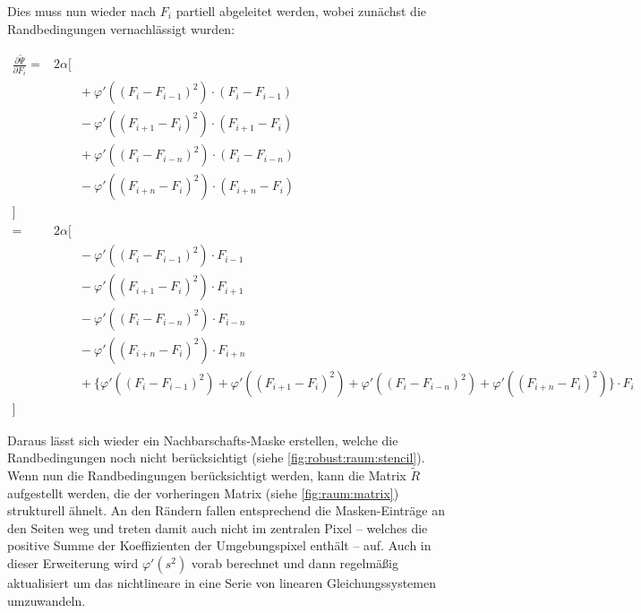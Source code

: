 Dies muss nun wieder nach $F_i$ partiell abgeleitet werden, wobei zunächst die Randbedingungen vernachlässigt wurden:

\begin{align}
\frac{\partial \tilde \Psi}{\partial F_i} =& 2\alpha[ \nonumber\\
    & \qquad + \varphi'((F_i - F_{i-1})^2)     \cdot (F_i - F_{i-1}) \nonumber\\
    & \qquad - \varphi'((F_{i+1} - F_{i})^2)   \cdot (F_{i+1} - F_i) \nonumber\\
    & \qquad + \varphi'((F_i - F_{i-n})^2)     \cdot (F_i - F_{i-n})\nonumber\\
    & \qquad - \varphi'((F_{i+n} - F_{i})^2)   \cdot (F_{i+n}- F_i)\nonumber\\
    ]\\
=& 2\alpha[ \nonumber\\
    & \qquad - \varphi'((F_i - F_{i-1})^2)     \cdot F_{i-1} \nonumber\\
    & \qquad - \varphi'((F_{i+1} - F_{i})^2)   \cdot F_{i+1} \nonumber\\
    & \qquad - \varphi'((F_i - F_{i-n})^2)     \cdot F_{i-n} \nonumber\\
    & \qquad - \varphi'((F_{i+n} - F_{i})^2)   \cdot F_{i+n} \nonumber\\
    & \qquad + \{\varphi'((F_i - F_{i-1})^2) + \varphi'((F_{i+1} - F_{i})^2) +\varphi'((F_i - F_{i-n})^2) + \varphi'((F_{i+n} - F_{i})^2)\} \cdot F_i \nonumber\\
    ]
\end{align}

Daraus lässt sich wieder ein Nachbarschafts-Maske erstellen, welche die Randbedingungen noch nicht berücksichtigt (siehe \autoref{fig:robust:raum:stencil}). Wenn nun die Randbedingungen berücksichtigt werden, kann die Matrix $\tilde R$  aufgestellt werden, die der vorheringen Matrix (siehe \autoref{fig:raum:matrix}) strukturell ähnelt. An den Rändern fallen entsprechend die Masken-Einträge an den Seiten weg und treten damit auch nicht im zentralen Pixel -- welches die positive Summe der Koeffizienten der Umgebungspixel enthält -- auf. Auch in dieser Erweiterung wird $\varphi'(s^2)$ vorab berechnet und dann regelmäßig aktualisiert um das nichtlineare in eine Serie von linearen Gleichungssystemen umzuwandeln.

